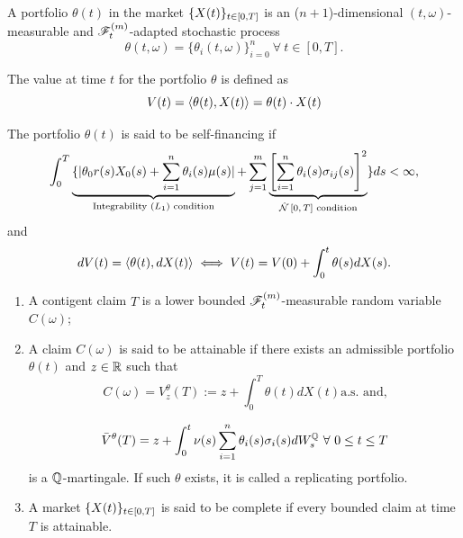 \documentclass{beamer}
\begin{document}
\begin{frame}
\begin{definition}
A portfolio $\theta(t)$ in the market $\{X(t)\}_{t\in[0,T]}$ is an ($n+1$)-dimensional $(t,\omega)$-measurable and $\mathscr{F}_t^{(m)}$-adapted stochastic process
\begin{equation}
	\theta(t,\omega) = \{\theta_{i}(t,\omega)\}_{i=0}^{n} \ \forall \ t\in[0, T].
\end{equation}
\end{definition}

\begin{definition}
The value at time $t$ for the portfolio $\theta$ is defined as
\begin{equation}
	V(t) = \langle \theta(t), X(t)\rangle = \theta(t) \cdot X(t)
\end{equation}
\end{definition}
\end{frame}

\begin{frame}
\begin{definition}\label{def:self-financing-portfolio}
	The portfolio $\theta(t)$ is said to be self-financing if
	\begin{equation*}
	\int_0^T\underbrace{\{|\theta_0r(s)X_0(s) + \sum_{i=1}^{n}\theta_i(s)\mu(s)|}_{\text{Integrability ($L_1$) condition}} + \sum_{j=1}^m\underbrace{\left[\sum_{i=1}^n\theta_i(s)\sigma_{ij}(s)\right]^2}_{\text{$\hat{\mathcal{N}}\left[0, T\right]$ condition}}\} ds < \infty,
	\end{equation*}
and 
\begin{equation*}
  dV(t) = \langle \theta(t), dX(t)\rangle \iff V(t) = V(0)  + \int_0^t \theta(s) dX(s).
\end{equation*}

\end{definition}
\end{frame}

\begin{frame}
	\begin{definition}
\begin{enumerate}
	\item A contigent claim $T$ is a lower bounded $\mathscr{F}_t^{(m)}$-measurable random variable $C(\omega)$;
	\item A claim $C(\omega)$ is said to be attainable if there exists an admissible portfolio $\theta(t)$ and $z\in\mathbb{R}$ such that
	\[
		C(\omega) = V_z^{\theta}(T) := z + \int_0^T \theta(t)dX(t) \text{a.s. and,}
	\]
	
	\begin{equation}
		\bar{V}^\theta(T)	 = z + \int_0^t \nu(s)\sum_{i=1}^{n}\theta_i(s)\sigma_i(s) dW^{\mathbb{Q}}_s \ \forall \ 0 \leq t \leq T
	\end{equation} 
	is a $\mathbb{Q}$-martingale. If such $\theta$ exists, it is called a replicating portfolio.
	\item A market $\{X(t)\}_{t\in[0,T]}$ is said to be complete if every bounded claim at time $T$ is attainable.
\end{enumerate}
\end{definition}
\end{frame}
\end{document}
